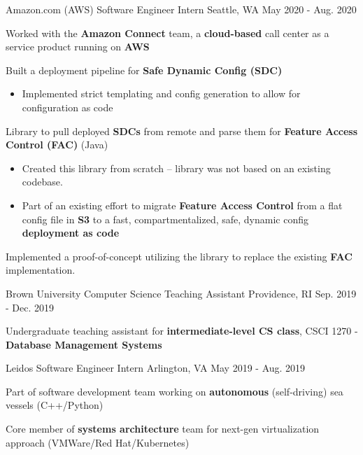 \begin{cventries}
    \cventry
    {Amazon.com (AWS)}
    {Software Engineer Intern}
    {Seattle, WA}
    {May 2020 - Aug. 2020}
    {
        \begin{cvitems}
        \item{Worked with the \textbf{Amazon Connect} team, a \textbf{cloud-based} call center as a service product running on \textbf{AWS}}
        \item{Built a deployment pipeline for \textbf{Safe Dynamic Config (SDC)}}
            \begin{itemize}
                \item{Implemented strict templating and config generation to allow for configuration as code}
            \end{itemize}
        \item{Library to pull deployed \textbf{SDCs} from remote and parse them for \textbf{Feature Access Control (FAC)} (Java)}
            \begin{itemize}
                \item{Created this library from scratch -- library was not based on an existing codebase.}
                \item{Part of an existing effort to migrate \textbf{Feature Access Control} from a flat config file in \textbf{S3} to a fast, compartmentalized, safe, dynamic config \textbf{deployment as code}}
            \end{itemize}
        \item{Implemented a proof-of-concept utilizing the library to replace the existing \textbf{FAC} implementation}.
        \end{cvitems}
    }
    \cventry
    {Brown University}
    {Computer Science Teaching Assistant}
	{Providence, RI}
	{Sep. 2019 - Dec. 2019}
    {
        \begin{cvitems}
		\item{Undergraduate teaching assistant for \textbf{intermediate-level CS class}, CSCI 1270 - \textbf{Database Management Systems}}
        \end{cvitems}
    }
    \cventry
    {Leidos}
    {Software Engineer Intern}
    {Arlington, VA}
    {May 2019 - Aug. 2019}
    {
        \begin{cvitems}
        \item{Part of software development team working on \textbf{autonomous} (self-driving) sea vessels (C++/Python)}
        \item{Core member of \textbf{systems architecture} team for next-gen virtualization approach (VMWare/Red Hat/Kubernetes)}

\end{cvitems}}
\end{cventries}
